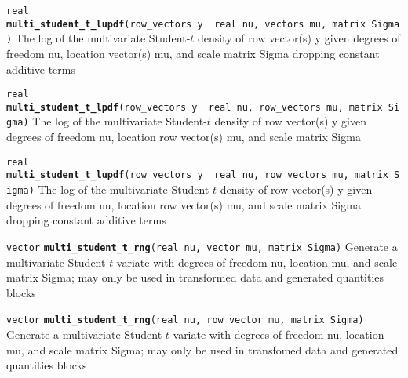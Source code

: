 \documentclass[
  10pt,
]{book}
\begin{document}

\texttt{real} \textbf{\texttt{multi\_student\_t\_lupdf}}\texttt{(row\_vectors\ y\ \textbar{}\ real\ nu,\ vectors\ mu,\ matrix\ Sigma)}\newline
The log of the multivariate Student-\(t\) density of row vector(s) y
given degrees of freedom nu, location vector(s) mu, and scale matrix
Sigma dropping constant additive terms


\texttt{real} \textbf{\texttt{multi\_student\_t\_lpdf}}\texttt{(row\_vectors\ y\ \textbar{}\ real\ nu,\ row\_vectors\ mu,\ matrix\ Sigma)}\newline
The log of the multivariate Student-\(t\) density of row vector(s) y
given degrees of freedom nu, location row vector(s) mu, and scale
matrix Sigma


\texttt{real} \textbf{\texttt{multi\_student\_t\_lupdf}}\texttt{(row\_vectors\ y\ \textbar{}\ real\ nu,\ row\_vectors\ mu,\ matrix\ Sigma)}\newline
The log of the multivariate Student-\(t\) density of row vector(s) y
given degrees of freedom nu, location row vector(s) mu, and scale
matrix Sigma dropping constant additive terms


\texttt{vector} \textbf{\texttt{multi\_student\_t\_rng}}\texttt{(real\ nu,\ vector\ mu,\ matrix\ Sigma)}\newline
Generate a multivariate Student-\(t\) variate with degrees of freedom
nu, location mu, and scale matrix Sigma; may only be used in transformed data
and generated quantities blocks


\texttt{vector} \textbf{\texttt{multi\_student\_t\_rng}}\texttt{(real\ nu,\ row\_vector\ mu,\ matrix\ Sigma)}\newline
Generate a multivariate Student-\(t\) variate with degrees of freedom
nu, location mu, and scale matrix Sigma; may only be used in transfomed data
and generated quantities blocks
\end{document}
